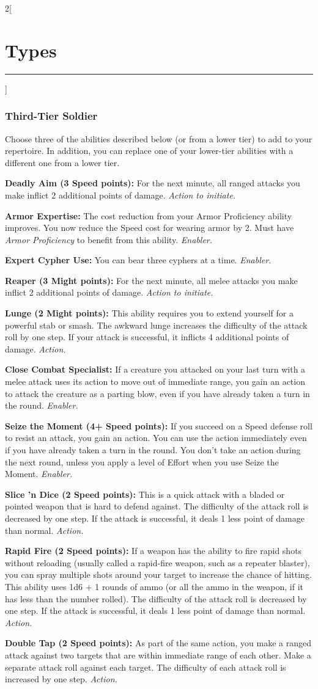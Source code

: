 \documentclass[a4paper,10pt,final]{book}
\newcommand{\HRule}{\rule{\linewidth}{0.5mm}} %
\newcommand{\newSection}[1]{\section*{#1} \addcontentsline{toc}{section}{#1} \label{sec:#1} \HRule}
\newcommand{\itemAbility}[2]{\textcolor{25gray}{\textbullet\textbf{ #1:}} {#2}\par}
\newcommand{\enabler}{\textit{ Enabler.}}
\newcommand{\action}{\textit{ Action.}}
\newcommand{\actionInit}{\textit{ Action to initiate.}}
\newenvironment{docsection}[1]
{
  \begin{multicols*}{2}[\newSection{#1}]
}
{
  \end{multicols*}
  \newpage
}
\begin{document}
\begin{docsection}{Types}
\subsubsection*{Third-Tier Soldier}
\label{subsub:soldierThirdTier}
Choose three of the abilities described below (or from a lower tier) to add to your repertoire. In addition, you can replace one of your lower-tier abilities with a different one from a lower tier.\par
\itemAbility{Deadly Aim (3 Speed points)}{For the next
minute, all ranged attacks you make inflict
2 additional points of damage.\actionInit}
\itemAbility{Armor Expertise}{The cost
reduction from your Armor Proficiency
ability improves. You now reduce the Speed
cost for wearing armor by 2. Must have \textit{Armor Proficiency} to benefit from this ability.\enabler}
\itemAbility{Expert Cypher Use}{You can bear three
cyphers at a time.\enabler}
\itemAbility{Reaper (3 Might points)}{For the next
minute, all melee attacks you make inflict
2 additional points of damage.\actionInit}
\itemAbility{Lunge (2 Might points)}{This ability
requires you to extend yourself for a powerful
stab or smash. The awkward lunge increases
the difficulty of the attack roll by one step.
If your attack is successful, it inflicts 4
additional points of damage.\action}
\itemAbility{Close Combat Specialist}{If a creature you attacked on
your last turn with a melee attack uses its
action to move out of immediate range, you
gain an action to attack the creature as a
parting blow, even if you have already taken
a turn in the round.\enabler}
\itemAbility{Seize the Moment (4+ Speed points)}{If you succeed on a Speed defense roll to
resist an attack, you gain an action. You can
use the action immediately even if you have
already taken a turn in the round. You don’t
take an action during the next round, unless
you apply a level of Effort when you use
Seize the Moment.\enabler}
\itemAbility{Slice 'n Dice (2 Speed points)}{This is a quick
attack with a bladed or pointed weapon that
is hard to defend against. The difficulty of
the attack roll is decreased by one step. If
the attack is successful, it deals 1 less point
of damage than normal.\action}
\itemAbility{Rapid Fire (2 Speed points)}{If a weapon
has the ability to fire rapid shots without
reloading (usually called a rapid-fire
weapon, such as a repeater blaster), you
can spray multiple shots around your target
to increase the chance of hitting. This ability
uses 1d6 + 1 rounds of ammo (or all the
ammo in the weapon, if it has less than the
number rolled). The difficulty of the attack
roll is decreased by one step. If the attack is
successful, it deals 1 less point of damage
than normal.\action}
\itemAbility{Double Tap (2 Speed points)}{As part
of the same action, you make a ranged attack against two targets that are within
immediate range of each other. Make a
separate attack roll against each target. The
difficulty of each attack roll is increased by
one step.\action}


\end{docsection}
\end{document}
